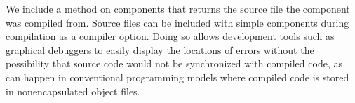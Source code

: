 We include a method
 on components that returns the source file the component was compiled from.
Source files can be included with simple components during compilation as a compiler option.
Doing so allows development tools such as graphical debuggers to easily display the 
locations of errors
without the possibility that source code would not be synchronized with compiled code, as can 
happen in conventional programming models where compiled code is stored in nonencapsulated object
files.

%
%
%
%
%  
%
%
%
%
%
%
